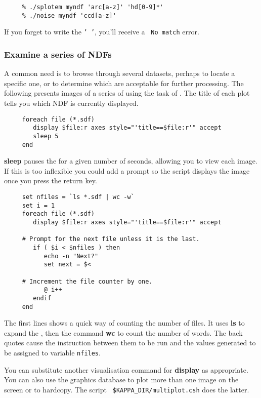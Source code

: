 \small
\begin{verbatim}
     % ./splotem myndf 'arc[a-z]' 'hd[0-9]*'
     % ./noise myndf 'ccd[a-z]'
\end{verbatim}
\normalsize
If you forget to write the {\tt '~'}, you'll receive a ~{\tt No match}
error.

\subsubsection{Examine a series of NDFs
\label{sc4_se_display_series}}

A common need is to browse through several datasets, perhaps to locate
a specific one, or to determine which are acceptable for further
processing.  The following presents images of a series of  using the  task of
\KAPPAref\@.  The title of each plot tells you which NDF is currently
displayed.

\small
\begin{verbatim}
     foreach file (*.sdf)
        display $file:r axes style="'title==$file:r'" accept
        sleep 5
     end
\end{verbatim}
\normalsize
{\bf sleep} pauses the  for a given
number of seconds, allowing you to view each image.  If this is too
inflexible you could add a prompt so the script displays the image
once you press the return key.

\small
\begin{verbatim}
     set nfiles = `ls *.sdf | wc -w`
     set i = 1
     foreach file (*.sdf)
        display $file:r axes style="'title==$file:r'" accept

     # Prompt for the next file unless it is the last.
        if ( $i < $nfiles ) then
           echo -n "Next?"
           set next = $<

     # Increment the file counter by one.
           @ i++
        endif
     end
\end{verbatim}
\normalsize
The first lines shows a quick way of counting the number of files. It
uses {\bf ls} to expand the , then
the command {\bf wc} to count the number of words.  The back quotes
cause the instruction between them to be run and the values generated
to be assigned to variable {\tt nfiles}.

You can substitute another visualisation command for {\bf display}
as appropriate.  You can also use the graphics database to plot more
than one image on the screen or to hardcopy.  The script {\tt
\$KAPPA\_DIR/multiplot.csh} does the latter.

